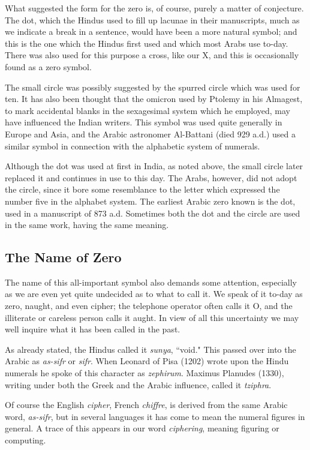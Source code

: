 \documentclass[11pt,a4paper]{article}
\begin{document}
What suggested the form for the zero is, of course, purely a matter of conjecture. The dot, which the Hindus used to fill up lacunae in their manuscripts, much as we indicate a break in a sentence, would have been a more natural symbol; and this is the one which the Hindus first used and which most Arabs use to-day. There was also used for this purpose a cross, like our X, and this is occasionally found as a zero symbol.

The small circle was possibly suggested by the spurred circle which was used for ten. It has also been thought that the omicron used by Ptolemy in his Almagest, to mark accidental blanks in the sexagesimal system which he employed, may have influenced the Indian writers. This symbol was used quite generally in Europe and Asia, and the Arabic astronomer Al-Battani (died 929 a.d.) used a similar symbol in connection with the alphabetic system of numerals.

Although the dot was used at first in India, as noted above, the small circle later replaced it and continues in use to this day. The Arabs, however, did not adopt the circle, since it bore some resemblance to the letter which expressed the number five in the alphabet system. The earliest Arabic zero known is the dot, used in a manuscript of 873 a.d. Sometimes both the dot and the circle are used in the same work, having the same meaning.

\subsection*{The Name of Zero}

The name of this all-important symbol also demands some attention, especially as we are even yet quite undecided as to what to call it. We speak of it to-day as zero, naught, and even cipher; the telephone operator often calls it O, and the illiterate or careless person calls it aught. In view of all this uncertainty we may well inquire what it has been called in the past.

As already stated, the Hindus called it \textit{sunya}, ``void." This passed over into the Arabic as \textit{as-sifr} or \textit{sifr}. When Leonard of Pisa (1202) wrote upon the Hindu numerals he spoke of this character as \textit{zephirum}. Maximus Planudes (1330), writing under both the Greek and the Arabic influence, called it \textit{tziphra}.

Of course the English \textit{cipher}, French \textit{chiffre}, is derived from the same Arabic word, \textit{as-sifr}, but in several languages it has come to mean the numeral figures in general. A trace of this appears in our word \textit{ciphering}, meaning figuring or computing.
\end{document}

